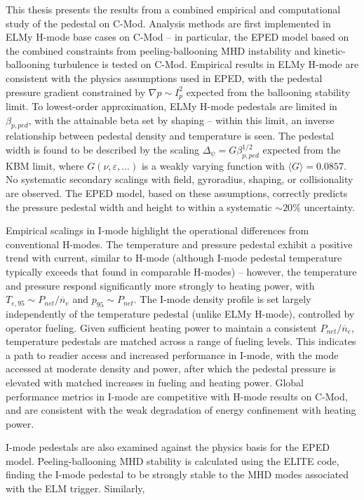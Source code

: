 This thesis presents the results from a combined empirical and computational study of the pedestal on C-Mod.  Analysis methods are first implemented in ELMy H-mode base cases on C-Mod -- in particular, the EPED model based on the combined constraints from peeling-ballooning MHD instability and kinetic-ballooning turbulence is tested on C-Mod.  Empirical results in ELMy H-mode are consistent with the physics assumptions used in EPED, with the pedestal pressure gradient constrained by $\nabla p \sim I_p^2$ expected from the ballooning stability limit.  To lowest-order approximation, ELMy H-mode pedestals are limited in $\beta_{p,ped}$, with the attainable beta set by shaping -- within this limit, an inverse relationship between pedestal density and temperature is seen.  The pedestal width is found to be described by the scaling  $\Delta_\psi = G \beta_{p,ped}^{1/2}$ expected from the KBM limit, where $G(\nu,\varepsilon,...)$ is a weakly varying function with $\langle G \rangle = 0.0857$.  No systematic secondary scalings with field, gyroradius, shaping, or collisionality are observed.  The EPED model, based on these assumptions, correctly predicts the pressure pedestal width and height to within a systematic $\sim 20\%$ uncertainty.

Empirical scalings in I-mode highlight the operational differences from conventional H-modes.  The temperature and pressure pedestal exhibit a positive trend with current, similar to H-mode (although I-mode pedestal temperature typically exceeds that found in comparable H-modes) -- however, the temperature and pressure respond significantly more strongly to heating power, with $T_{e,95} \sim P_{net}/\overline{n}_e$ and $p_{95} \sim P_{net}$.  The I-mode density profile is set largely independently of the temperature pedestal (unlike ELMy H-mode), controlled by operator fueling.  Given sufficient heating power to maintain a consistent $P_{net}/\overline{n}_e$, temperature pedestals are matched across a range of fueling levels.  This indicates a path to readier access and increased performance in I-mode, with the mode accessed at moderate density and power, after which the pedestal pressure is elevated with matched increases in fueling and heating power.  Global performance metrics in I-mode are competitive with H-mode results on C-Mod, and are consistent with the weak degradation of energy confinement with heating power.

I-mode pedestals are also examined against the physics basis for the EPED model.  Peeling-ballooning MHD stability is calculated using the ELITE code, finding the I-mode pedestal to be strongly stable to the MHD modes associated with the ELM trigger.  Similarly, 

